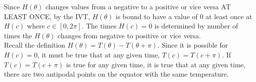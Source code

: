 \documentclass[12pt]{book}
\begin{document}
\begin{enumerate}
Since $H(\theta)$ changes values from a negative to a positive or vice versa AT LEAST ONCE, by the IVT, $H(\theta)$ is bound to have a value of 0 at least once at $H(c)$ where $c\in[0,2\pi]$. The times $H(c) = 0$ is determined by number of times the $H(\theta)$ changes from negative to positive or vice versa.\\

Recall the definition $H(\theta) = T(\theta) - T(\theta+\pi)$. Since it is possible for $H(c) = 0$, it must be true that at any given time, $T(c) = T(c+\pi)$. If $T(c) = T(c+\pi)$ is true for any given time, it is true that at any given time, there are two antipodal points on the equator with the same temperature.


\newpage



\end{enumerate}
\end{document}

